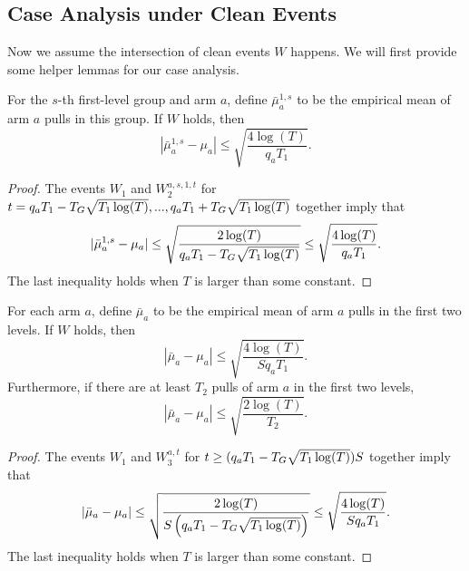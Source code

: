 \subsection{Case Analysis under Clean Events}
Now we assume the intersection of clean events $W$ happens. We will
first provide some helper lemmas for our case analysis.

\begin{lemma}
  For the $s$-th first-level group and arm $a$, define
  $\bar{\mu}_a^{1,s}$ to be the empirical mean of arm $a$ pulls in
  this group. If $W$ holds, then
  \[
    |\bar{\mu}_a^{1,s} - \mu_a| \leq \sqrt{\frac{4\log(T)}{q_a T_1}}.
  \]
\end{lemma}

\begin{proof}
  The events $W_1$ and $W_2^{a,s,1,t}$ for
  $t = q_a T_1- T_G \sqrt{T_1\log(T)},...,q_a T_1 + T_G
  \sqrt{T_1\log(T)}$ together imply that
\[
|\bar{\mu}_a^{1,s} - \mu_a| \leq \sqrt{\frac{2\log(T)}{q_a T_1- T_G \sqrt{T_1\log(T)}}} \leq \sqrt{\frac{4\log(T)}{q_a T_1}}.
\]
The last inequality holds when $T$ is larger than some constant.
\end{proof}


\begin{lemma}
  For each arm $a$, define $\bar{\mu}_a$ to be the empirical mean of
  arm $a$ pulls in the first two levels. If $W$ holds, then
  \[
    |\bar{\mu}_a - \mu_a| \leq \sqrt{\frac{4\log(T)}{S q_a T_1}} .
  \]
Furthermore, if there are at least $T_2$ pulls of arm $a$ in the first
two levels,
\[
|\bar{\mu}_a-\mu_a| \leq \sqrt{\frac{2\log(T)}{T_2}}. 
\]
\end{lemma}

\begin{proof}
The events $W_1$ and $W_3^{a,t}$ for $t \geq  (q_a T_1- T_G \sqrt{T_1\log(T)})S$ together imply that
  \[
    |\bar{\mu}_a - \mu_a| \leq \sqrt{\frac{2\log(T)}{S\left(q_a T_1- T_G \sqrt{T_1\log(T)}\right)}} \leq \sqrt{\frac{4\log(T)}{S q_a T_1}} .
\]
The last inequality holds when $T$ is larger than some constant.
\end{proof}




